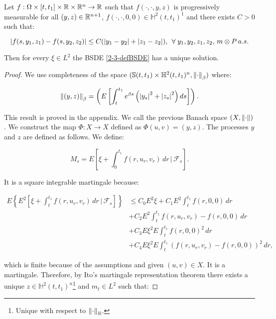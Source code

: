 \begin{theorem}
    Let $f:\Omega\times[t,t_1]\times\mathbb{R}\times\mathbb{R}^n\rightarrow \mathbb{R}$ such that $f(\cdot,\cdot,y,z)$ is progressively measurable for all 
    $(y,z)\in\mathbb{R}^{n+1}$, $f(\cdot,\cdot,0,0)\in\mathbb{H}^2(t,t_1)^1$ and there exists $C>0$ such that:

    \begin{equation}
        \abs{f(s,y_1,z_1)-f(s,y_2,z_2)} \leq C(\abs{y_1-y_2} + \abs{z_1-z_2}),\,\forall y_1,y_2,z_1,z_2,\, m\otimes P\,a.s.
    \end{equation}

    Then for every $\xi\in L^2$ the BSDE \ref{2-3-defBSDE} has a unique solution.

    \begin{proof}
        We use completeness of the space $(\mathbb{S}(t,t_1)\times\mathbb{H}^2(t,t_1)^n, \norm{\cdot}_{\beta})$ where:

        \begin{equation}
            \norm{(y,z)}_{\beta} = \left(E\left[\int_t^{t_1} e^{\beta s}\left(\abs{y_s}^2+\abs{z_s}^2\right)ds\right]\right).
        \end{equation}

        {\color{red}{}This result is proved in the appendix}. We call the previous Banach space $(X,\norm{\cdot})$. We construct the map 
        $\Phi:X\rightarrow X$ defined as $\Phi(u,v)=(y,z)$. The processes $y$ and $z$ are defined as follows. We define:

        \begin{equation}
            M_s = E\left[\xi + \int_0^{t_1} f(r,u_r,v_r)\,dr\,|\,\mathcal{F}_s\right].
        \end{equation}

        It is a square integrable martingale because:
        
        \begin{align*}
            E\left\{E^2\left[\xi + \int_t^{t_1} f(r,u_r,v_r)\,dr\,|\,\mathcal{F}_s\right]\right\} & \leq C_0 E^2\xi + C_1E^2\int_t^{t_1} f(r,0,0)\,dr \\
            & + C_2E^2\int_t^{t_1} f(r,u_r,v_r)-f(r,0,0)\,dr \\
            & + C_3E\xi^2E\int_t^{t_1}f(r,0,0)^2\,dr \\
            & + C_4E\xi^2E\int_t^{t_1}(f(r,u_r,v_r)-f(r,0,0))^2\,dr, 
        \end{align*}

        which is finite because of the assumptions and given $(u,v)\in X$. It is a martingale. Therefore, by 
        Ito's martingale representation theorem there exists a unique $z\in\mathbb{H}^2(t,t_1)^n$\footnote{Unique with respect to $\norm{\cdot}_{\mathbb{H}}$.} and $m_t\in L^2$ such that:
        

\end{proof}
\end{theorem}
